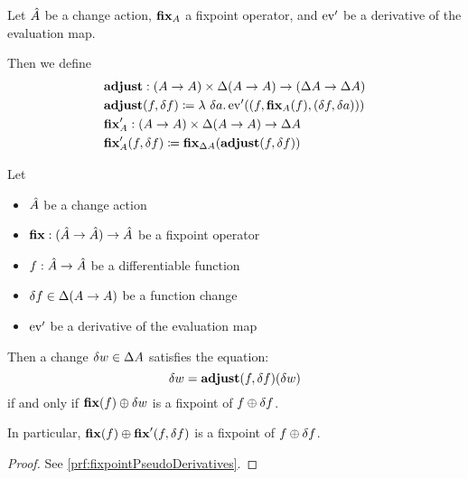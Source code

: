 \begin{defn}
  Let $\hat{A}$ be a change action, $\mathbf{fix}_A$ a fixpoint operator, and
  $\operatorname{ev}'$ be a derivative of the evaluation map.

  Then we define
  \begin{align*}
    &\mathbf{adjust} : (A \rightarrow A) \times \Delta (A \rightarrow A) \rightarrow (\Delta A \rightarrow \Delta A)\\
    &\mathbf{adjust}(f, \delta f) \coloneqq \lambda\ \delta a . \operatorname{ev}'((f,
    \mathbf{fix}_A(f), (\delta f, \delta a)))\\
    &\mathbf{fix}_A' : (A \rightarrow A) \times \Delta (A \rightarrow A) \rightarrow \Delta A\\
    &\mathbf{fix}_A'(f, \delta f) \coloneqq \mathbf{fix}_{\Delta A}(\mathbf{adjust}(f, \delta f))
  \end{align*}
\end{defn}

\begin{thm}[name=Pseudo-derivatives of fixpoints, restate=fixpointPseudoDerivatives]
\label{thm:fixpointPseudoDerivatives}
  Let
  \begin{itemize}
    \item $\hat{A}$ be a change action
    \item $\mathbf{fix} : (\hat{A} \rightarrow \hat{A}) \rightarrow \hat{A}$ be a fixpoint operator
    \item $f: \hat{A} \rightarrow \hat{A}$ be a differentiable function
    \item $\delta f \in \Delta (A \rightarrow A)$ be a function change 
    \item $\operatorname{ev}'$ be a derivative of the evaluation map
  \end{itemize}

  Then a change $\delta w \in \Delta A$ satisfies
  the equation:
  \begin{equation}\label{eqn:fixcondition}
    \delta w = \mathbf{adjust}(f, \delta f)(\delta w)
  \end{equation}
  if and only if $\mathbf{fix}(f) \oplus \delta w$ is a fixpoint of $f \oplus \delta f$.

  In particular, $\mathbf{fix}(f) \oplus \mathbf{fix}'(f, \delta f)$ is a fixpoint
  of $f \oplus \delta f$.
\end{thm}
\ifproofs
\begin{proof}
  See \cref{prf:fixpointPseudoDerivatives}.
\end{proof}
\fi

